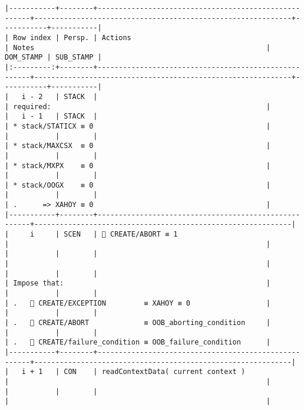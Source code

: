 \documentclass[varwidth=\maxdimen,margin=0.5cm,multi={verbatim}]{standalone}
\begin{document}
\begin{verbatim}
|-----------+--------+------------------------------------------------------+-------------------------------------------------------------+-----------+-----------|
| Row index | Persp. | Actions                                              | Notes                                                       | DOM_STAMP | SUB_STAMP |
|:---------:+--------+------------------------------------------------------+-------------------------------------------------------------+-----------+-----------|
|   i - 2   | STACK  |                                                      | required:                                                   |
|   i - 1   | STACK  |                                                      | * stack/STATICX ≡ 0                                         |
|           |        |                                                      | * stack/MAXCSX  ≡ 0                                         |
|           |        |                                                      | * stack/MXPX    ≡ 0                                         |
|           |        |                                                      | * stack/OOGX    ≡ 0                                         |
|           |        |                                                      | .      => XAHOY ≡ 0                                         |
|-----------+--------+------------------------------------------------------+-------------------------------------------------------------|
|     i     | SCEN   |  CREATE/ABORT ≡ 1                                   |                                                             |
|           |        |                                                      |                                                             |
|           |        |                                                      | Impose that:                                                |
|           |        |                                                      | .    CREATE/EXCEPTION         ≡ XAHOY ≡ 0                  |
|           |        |                                                      | .    CREATE/ABORT             ≡ OOB_aborting_condition     |
|           |        |                                                      | .    CREATE/failure_condition ≡ OOB_failure_condition      |
|-----------+--------+------------------------------------------------------+-------------------------------------------------------------|
|   i + 1   | CON    | readContextData( current context )                   |                                                             |
|           |        |                                                      |                                                             |

\end{verbatim}
\end{document}
